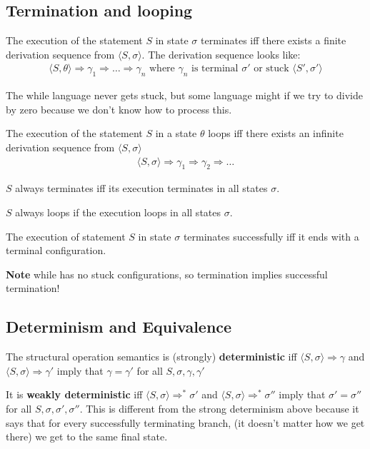 \documentclass[11pt,a4paper,headsepline,titlepage,dvipsnames,cmyk]{scrartcl}
\begin{document}
\subsection{Termination and looping}%
\label{sub:term-loop}

The execution of the statement $S$ in state $\sigma$ terminates iff there
exists a finite derivation sequence from $\langle S, \sigma \rangle$. The
derivation sequence looks like:
\begin{align*}
    \langle S, \theta\rangle \Rightarrow \gamma_1 \Rightarrow \dots
    \Rightarrow \gamma_n \text{ where } \gamma_n \text{ is terminal }
    \sigma' \text{ or stuck } \langle S', \sigma'\rangle
\end{align*}

The while language never gets stuck, but some language might if we try to
divide by zero because we don't know how to process this.

The execution of the statement $S$ in a state $\theta$ loops iff there
exists an infinite derivation sequence from $\langle S, \sigma \rangle$
\begin{align*}
    \langle S, \sigma \rangle \Rightarrow \gamma_1 \Rightarrow \gamma_2
    \Rightarrow \dots
\end{align*}

$S$ always terminates iff its execution terminates in all states $\sigma$.

$S$ always loops if the execution loops in all states $\sigma$.

The execution of statement $S$ in state $\sigma$ terminates successfully
iff it ends with a terminal configuration.

\textbf{Note} while has no stuck configurations, so termination implies
successful termination!

\subsection{Determinism and Equivalence}%
\label{sub:determinism}
The structural operation semantics is (strongly) \textbf{deterministic}
iff $\langle S, \sigma \rangle \Rightarrow \gamma$ and $\langle S, \sigma
\rangle \Rightarrow \gamma'$ imply that $\gamma = \gamma'$ for all $S,
\sigma, \gamma, \gamma'$

It is \textbf{weakly deterministic} iff $\langle S, \sigma \rangle
\Rightarrow^* \sigma'$ and $\langle S, \sigma \rangle \Rightarrow^*
\sigma''$ imply that $\sigma' = \sigma''$ for all $S, \sigma, \sigma',
\sigma''$. This is different from the strong determinism above because it
says that for every successfully terminating branch, (it doesn't matter
how we get there) we get to the same final state.
\end{document}
